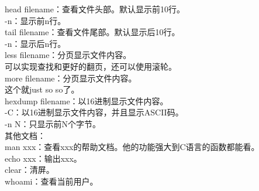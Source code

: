 \documentclass{article}
\begin{document}
\noindent
head filename：查看文件头部。默认显示前10行。\\
\qquad -n：显示前n行。\\

\noindent
tail filename：查看文件尾部。默认显示后10行。\\
\qquad -n：显示后n行。\\

\noindent
less filename：分页显示文件内容。\\
\qquad 可以实现查找和更好的翻页，还可以使用滚轮。\\

\noindent
more filename：分页显示文件内容。\\
\qquad 这个就just so so了。\\

\noindent
hexdump filename：以16进制显示文件内容。\\
\qquad -C：以16进制显示文件内容，并且显示ASCII码。\\
\qquad -n N：只显示前N个字节。\\

\noindent
其他文档：\\
man xxx：查看xxx的帮助文档。他的功能强大到C语言的函数都能看。\\
echo xxx：输出xxx。\\

\noindent
clear：清屏。\\
whoami：查看当前用户。\\

\noindent
\end{document}
